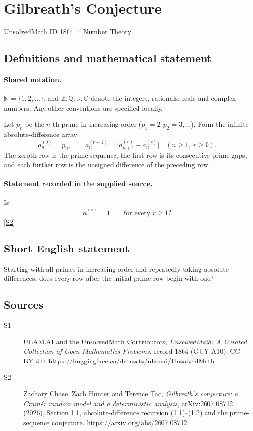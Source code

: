 \documentclass[11pt]{article}
\newcommand{\sref}[2]{\hyperlink{source:#1:#2}{[S#2]}}
\begin{document}
\setcounter{section}{1863}
\section{Gilbreath's Conjecture}\label{1864}
{\small\sffamily UnsolvedMath ID 1864 · Number Theory}
\subsection{Definitions and mathematical statement}

\paragraph{Shared notation.}$\mathbb N=\{1,2,\ldots\}$, and $\mathbb Z,\mathbb Q,\mathbb R,\mathbb C$ denote the integers, rationals, reals and complex numbers. Any other conventions are specified locally.


Let \(p_n\) be the \(n\)-th prime in increasing order
(\(p_1=2,p_2=3,\ldots\)). Form the infinite absolute-difference array
\[
 a_n^{(0)}=p_n,\qquad
 a_n^{(r+1)}=\bigl|a_{n+1}^{(r)}-a_n^{(r)}\bigr|
                  \quad(n\ge1,\ r\ge0).
\]
The zeroth row is the prime sequence, the first row is its consecutive
prime gaps, and each further row is the unsigned difference of the preceding row.
\paragraph{Statement recorded in the supplied source.}
Is
\[
                         a_1^{(r)}=1\qquad\text{for every }r\ge1?
\] \sref{1864}{2}
\subsection{Short English statement}
Starting with all primes in increasing order and repeatedly taking absolute differences, does every row after the initial prime row begin with one?
\subsection{Sources}
\begin{description}
\item[\hypertarget{source:1864:1}{S1}] ULAM.AI and the UnsolvedMath Contributors, \emph{UnsolvedMath: A Curated Collection of Open Mathematics Problems}, record 1864 (GUY-A10). CC BY 4.0. \url{https://huggingface.co/datasets/ulamai/UnsolvedMath}.
\item[\hypertarget{source:1864:2}{S2}] Zachary Chase, Zach Hunter and Terence Tao, \emph{Gilbreath's conjecture: a Cram\'er random model and a deterministic analysis}, arXiv:2607.08712 (2026), Section 1.1, absolute-difference recursion (1.1)--(1.2) and the prime-sequence conjecture. \url{https://arxiv.org/abs/2607.08712}.
\end{description}
\label{end:1864}
\end{document}
